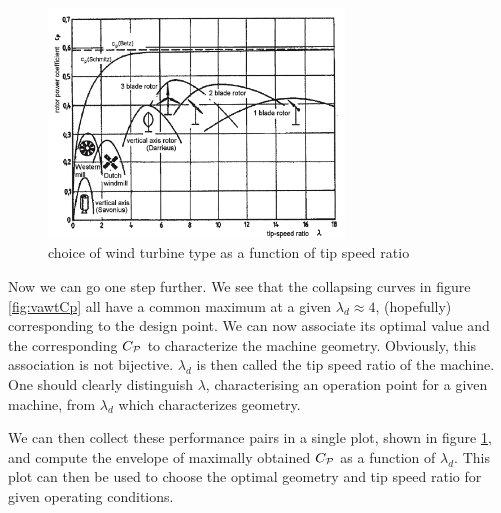 \begin{figure}[!h]
  \centering
  \includegraphics[width=0.7\textwidth]{principles/wt_types_ifo_tsr.png}
  \caption{choice of wind turbine type as a function of tip speed ratio}
  \label{fig:choiceWT}
\end{figure}
Now we can go one step further. We see that the collapsing curves in
figure \ref{fig:vawtCp} all have a common maximum at a given
$\lambda_d \approx 4$, (hopefully) corresponding to the design
point. We can now associate its optimal value and the corresponding
$C_{\mathcal P}$ to characterize the machine geometry. Obviously, this
association is not bijective. $\lambda_d$ is then called the tip speed
ratio of the machine. One should clearly distinguish $\lambda$,
characterising an operation point for a given machine, from
$\lambda_d$ which characterizes geometry.

We can then collect these performance pairs in a single plot, shown in
figure \ref{fig:choiceWT}, and compute the envelope of maximally
obtained $C_{\mathcal P}$ as a function of $\lambda_d$. This plot can then
be used to choose the optimal geometry and tip speed ratio for given
operating conditions.

